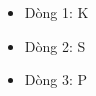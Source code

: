 \begin{itemize}
	\item     Dòng 1: K   
	\item     Dòng 2: S   
	\item     Dòng 3: P   
\end{itemize}

\